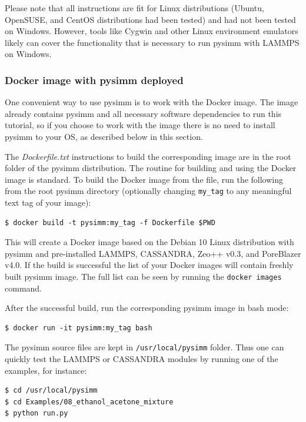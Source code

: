 \documentclass[9pt,tutorial]{livecoms}
\begin{document}
Please note that all instructions are fit for Linux distributions (Ubuntu, OpenSUSE, and CentOS distributions had been tested) and had not been tested on Windows. However, tools like Cygwin and other Linux environment emulators likely can cover the functionality that is necessary to run pysimm with LAMMPS on Windows. 

\subsubsection{Docker image with pysimm deployed}

One convenient way to use pysimm is to work with the Docker image.
The image already contains pysimm and all necessary software dependencies to run this tutorial, so if you choose to work with the image there is no need to install pysimm to your OS, as described below in this section.

The \textit{Dockerfile.txt} instructions to build the corresponding image are in the root folder of the pysimm distribution. The routine for building and using the Docker image is standard. To build the Docker image from the file, run the following from the root pysimm directory (optionally changing \lstinline$my_tag$ to any meaningful text tag of your image):

\begin{lstlisting}
$ docker build -t pysimm:my_tag -f Dockerfile $PWD
\end{lstlisting}

This will create a Docker image based on the Debian 10 Linux distribution with pysimm and pre-installed LAMMPS, CASSANDRA, Zeo++ v0.3, and PoreBlazer v4.0. If the build is successful the list of your Docker images will contain freshly built pysimm image. The full list can be seen by running the \lstinline$docker images$ command. 

After the successful build, run the corresponding pysimm image in bash mode:
\begin{lstlisting}
$ docker run -it pysimm:my_tag bash
\end{lstlisting}

The pysimm source files are kept in \lstinline$/usr/local/pysimm$ folder. Thus one can quickly test the LAMMPS or CASSANDRA modules by running one of the examples, for instance:

\begin{lstlisting}
$ cd /usr/local/pysimm
$ cd Examples/08_ethanol_acetone_mixture
$ python run.py
\end{lstlisting}
\end{document}
